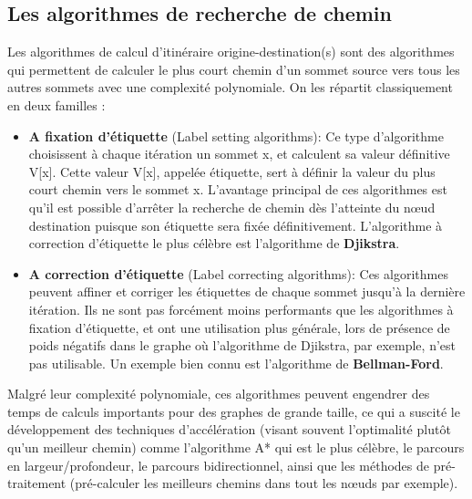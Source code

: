 \subsection{Les algorithmes de recherche de chemin}
Les algorithmes de calcul d'itinéraire origine-destination(s) sont des algorithmes qui permettent de calculer le plus court chemin d'un sommet source vers tous les autres sommets avec une complexité polynomiale.\newline
 On les répartit classiquement en deux familles : 
\begin{itemize}
	\item \textbf{A fixation d'étiquette} (Label setting algorithms): Ce type d'algorithme choisissent à chaque itération un sommet x, et calculent sa valeur définitive V[x]. Cette valeur V[x], appelée étiquette, sert à définir la valeur du plus court chemin vers le sommet x.
	L'avantage principal de ces algorithmes est qu'il est possible d'arrêter la recherche de chemin dès l'atteinte du nœud destination puisque son étiquette sera fixée définitivement.
	L'algorithme à correction d'étiquette le plus célèbre est l'algorithme de \textbf{Djikstra}\cite{Djikstra}.
	
	\item \textbf{A correction d'étiquette} (Label correcting algorithms): Ces algorithmes peuvent affiner et corriger les étiquettes de chaque sommet jusqu'à la dernière itération.
	Ils ne sont pas forcément moins performants que les algorithmes à fixation d'étiquette, et ont une utilisation plus générale, lors de présence de poids négatifs dans le graphe où l'algorithme de Djikstra, par exemple, n'est pas utilisable.\newline
	Un exemple bien connu est l'algorithme de \textbf{Bellman-Ford}.
\end{itemize}

Malgré leur complexité polynomiale, ces algorithmes peuvent engendrer des temps de calculs importants pour des graphes de grande taille, ce qui a suscité le développement des techniques d'accélération (visant souvent l'optimalité plutôt qu'un meilleur chemin) comme l'algorithme A* qui est le plus célèbre, le parcours en largeur/profondeur, le parcours bidirectionnel, ainsi que les méthodes de pré-traitement (pré-calculer les meilleurs chemins dans tout les nœuds par exemple).

